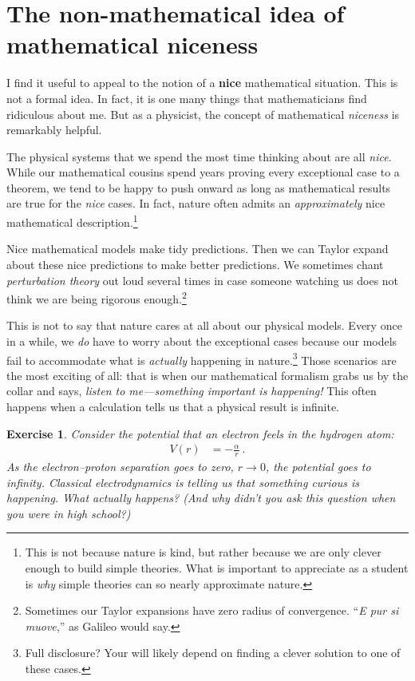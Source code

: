 \documentclass[
  11pt,
	colorful,
	raggedright,
]{tufte-style-thesis-flip}
\newtheorem{exercise}{Exercise}[section]
\begin{document}
\section{The non-mathematical idea  of mathematical niceness}
\label{sec:niceness}

I find it useful to appeal to the notion of a \textbf{nice} mathematical situation. This is not a formal idea. In fact, it is one many things that mathematicians find ridiculous about me. But as a physicist, the concept of mathematical \emph{niceness} is remarkably helpful.

The physical systems that we spend the most time thinking about are all \emph{nice}. 
%
While our mathematical cousins spend years proving every exceptional case to a theorem, we tend to be happy to push onward as long as mathematical results are true for the \emph{nice} cases. 
%
In fact, nature often admits an \emph{approximately} nice mathematical description.\footnote{This is not because nature is kind, but rather because we are only clever enough to build simple theories. What is important to appreciate as a student is \emph{why} simple theories can so nearly approximate nature.}

%
Nice mathematical models make tidy predictions. Then we can Taylor expand about these nice predictions to make better predictions.
%
We sometimes chant \emph{perturbation theory} out loud several times in case someone watching us does not think we are being rigorous enough.\footnote{Sometimes our Taylor expansions have zero radius of convergence. ``\emph{E pur si muove},'' as Galileo would say.}


This is not to say that nature cares at all about our physical models. 
%
Every once in a while, we \emph{do} have to worry about the exceptional cases because our models fail to accommodate what is \emph{actually} happening in nature.\footnote{Full disclosure? Your  will likely depend on finding a clever solution to one of these cases.} Those scenarios are the most exciting of all: that is when our mathematical formalism grabs us by the collar and says, \emph{listen to me---something important is happening!} This often happens when a calculation tells us that a physical result is infinite. 

\begin{exercise}\label{ex:hydrogen:problem}
Consider the potential that an electron feels in the hydrogen atom:
\begin{align}
  V(r) &= -\frac{\alpha}{r} \ .
\end{align}
As the electron--proton separation goes to zero, $r\to 0$, the potential goes to infinity. Classical electrodynamics is telling us that something curious is happening. What actually happens? (And why didn't you ask this question when you were in high school?)
\end{exercise}
\end{document}
